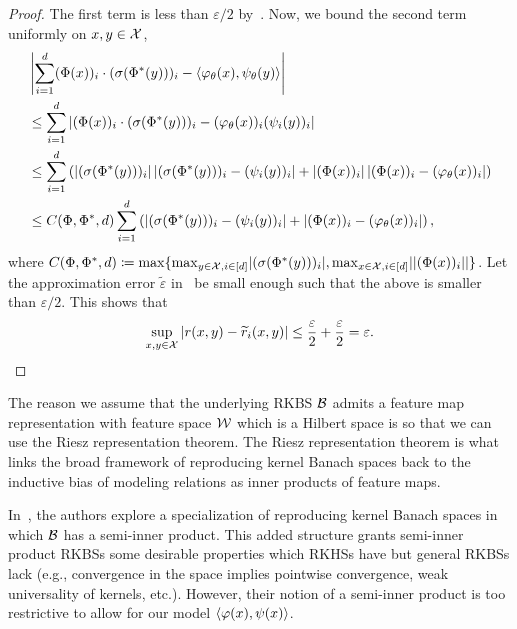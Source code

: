 \begin{proof}
    The first term is less than $\varepsilon / 2$ by~. Now, we bound the second term uniformly on $x,y \in {\mathcal{X}}$,
    \begin{align*}
        &\abs{\sum_{i=1}^{d} (\Phi(x))_i \cdot (\sigma(\Phi^*(y)))_i - \iprod{\phi_\theta(x)}{\psi_\theta(y)}} \\
        &\leq \sum_{i=1}^{d} \abs{(\Phi(x))_i \cdot (\sigma(\Phi^*(y)))_i - (\phi_\theta(x))_i(\psi_i(y))_i} \\
        &\leq \sum_{i=1}^{d} \paren{\abs{(\sigma(\Phi^*(y)))_i} \abs{(\sigma(\Phi^*(y)))_i - (\psi_i(y))_i} + \abs{(\Phi(x))_i} \abs{(\Phi(x))_i - (\phi_\theta(x))_i}}\\
        &\leq C(\Phi, \Phi^*, d) \sum_{i=1}^{d} \paren{\abs{(\sigma(\Phi^*(y)))_i - (\psi_i(y))_i} + \abs{(\Phi(x))_i - (\phi_\theta(x))_i}},
    \end{align*}
    where $C(\Phi, \Phi^*, d) \coloneq \max\{\max_{y \in {\mathcal{X}}, i \in [d]} \lvert(\sigma(\Phi^*(y)))_i\rvert, \max_{x \in {\mathcal{X}}, i \in [d]} \lvert\left\lvert(\Phi(x))_i\right\rvert\rvert\}$. Let the approximation error $\tilde{\varepsilon}$ in~ be small enough such that the above is smaller than $\varepsilon / 2$. This shows that
    \begin{equation*}
        \sup_{x,y \in \calX} \abs{r(x,y) - \tilde{r}_i(x,y)} \leq \frac{\varepsilon}{2} + \frac{\varepsilon}{2} = \varepsilon.
    \end{equation*}
\end{proof}

\begin{remark}
    The reason we assume that the underlying RKBS ${\mathcal{B}}$ admits a feature map representation with feature space ${\mathcal{W}}$ which is a Hilbert space is so that we can use the Riesz representation theorem. The Riesz representation theorem is what links the broad framework of reproducing kernel Banach spaces back to the inductive bias of modeling relations as inner products of feature maps.
\end{remark}

\begin{remark}
    In~\parencite{zhangReproducingKernel2009}, the authors explore a specialization of reproducing kernel Banach spaces in which ${\mathcal{B}}$ has a semi-inner product. This added structure grants semi-inner product RKBSs some desirable properties which RKHSs have but general RKBSs lack (e.g., convergence in the space implies pointwise convergence, weak universality of kernels, etc.). However, their notion of a semi-inner product is too restrictive to allow for our model $\left \langle \varphi(x), \psi(x) \right\rangle$.
\end{remark}